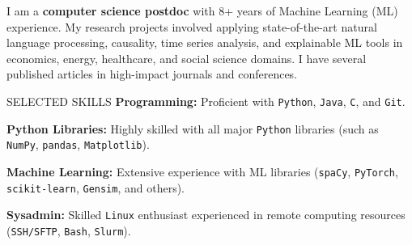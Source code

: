 \documentclass{resume} %
\begin{document}


\vspace{-0.4cm}
\begin{rSection}{}
I am a \textbf{computer science postdoc} with 8+ years of Machine Learning (ML) experience. My research projects involved applying state-of-the-art natural language processing, causality, time series analysis, and explainable ML tools in economics, energy, healthcare, and social science domains. I have several published articles in high-impact journals and conferences.
\end{rSection}



\vspace{-0.1cm}
\begin{rSection}{SELECTED SKILLS}
\textbf{Programming:} Proficient with \texttt{Python}, \texttt{Java}, \texttt{C}, and \texttt{Git}.
\vspace{-0.2cm}

\textbf{Python Libraries:} Highly skilled with all major \texttt{Python} libraries (such as \texttt{NumPy}, \texttt{pandas}, \texttt{Matplotlib}).
\vspace{-0.2cm}

\textbf{Machine Learning:} Extensive experience with ML libraries (\texttt{spaCy}, \texttt{PyTorch}, \texttt{scikit-learn}, \texttt{Gensim}, and others).
\vspace{-0.7cm}

\textbf{Sysadmin:} Skilled \texttt{Linux} enthusiast experienced in remote computing resources (\texttt{SSH/SFTP}, \texttt{Bash}, \texttt{Slurm}).
\end{rSection}
\end{document}
